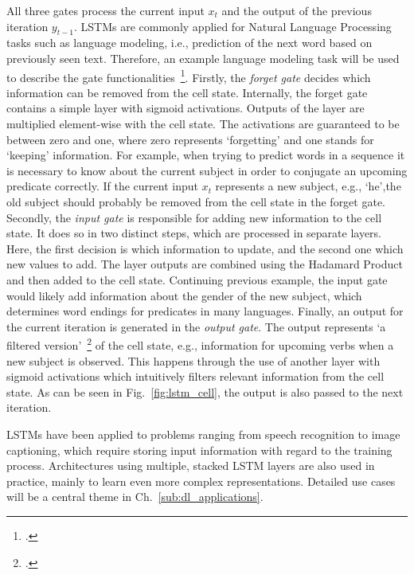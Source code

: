 All three gates process the current input $x_t$ and the output of the previous
iteration $y_{t-1}$.
LSTMs are commonly applied for Natural Language Processing tasks such as
language modeling, i.e., prediction of the next word based on previously seen
text.
Therefore, an example language modeling task will be used to describe the
gate functionalities~\footcite{Olah2015}.
Firstly, the \textit{forget gate} decides which information can be removed from
the cell state.
Internally, the forget gate contains a simple layer with sigmoid activations.
Outputs of the layer are multiplied element-wise with the cell state.
The activations are guaranteed to be between zero and one, where zero represents
`forgetting' and one stands for `keeping' information.
For example, when trying to predict words in a sequence it is necessary
to know about the current subject in order to conjugate an upcoming predicate
correctly.
If the current input $x_t$ represents a new subject, e.g., `he',the old subject should
probably be removed from the cell state in the forget gate.
Secondly, the \textit{input gate} is responsible for adding new information to the cell
state.
It does so in two distinct steps, which are processed in separate layers.
Here, the first decision is which information to update, and the second one
which new values to add.
The layer outputs are combined using the Hadamard Product and then added to the
cell state.
Continuing previous example, the input gate would likely add information about
the gender of the new subject, which determines word endings for predicates in
many languages.
Finally, an output for the current iteration is generated in the \textit{output gate}.
The output represents `a filtered version'~\footcite{Olah2015} of the cell state, e.g.,
information for upcoming verbs when a new subject is observed.
This happens through the use of another layer with sigmoid activations which
intuitively filters relevant information from the cell state.
As can be seen in Fig.~\ref{fig:lstm_cell}, the output is also passed to the
next iteration.

LSTMs have been applied to problems ranging from speech recognition to
image captioning, which require storing input information with regard to the
training process.
Architectures using multiple, stacked LSTM layers are also used in practice,
mainly to learn even more complex representations.
Detailed use cases will be a central theme in Ch.~\ref{sub:dl_applications}.

